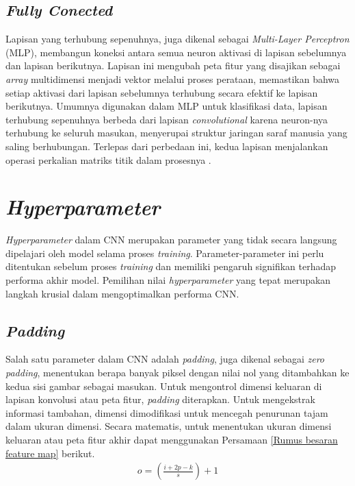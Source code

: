     
\subsection{\textit{Fully Conected}}

    Lapisan yang terhubung sepenuhnya, juga dikenal sebagai \textit{Multi-Layer Perceptron} (MLP), membangun koneksi antara semua neuron aktivasi di lapisan sebelumnya dan lapisan berikutnya. Lapisan ini mengubah peta fitur yang disajikan sebagai \textit{array} multidimensi menjadi vektor melalui proses perataan, memastikan bahwa setiap aktivasi dari lapisan sebelumnya terhubung secara efektif ke lapisan berikutnya. Umumnya digunakan dalam MLP untuk klasifikasi data, lapisan terhubung sepenuhnya berbeda dari lapisan \textit{convolutional} karena neuron-nya terhubung ke seluruh masukan, menyerupai struktur jaringan saraf manusia yang saling berhubungan. Terlepas dari perbedaan ini, kedua lapisan menjalankan operasi perkalian matriks titik dalam prosesnya \cite{Dewi2018}.

    





\section{\textit{Hyperparameter}}

    \textit{Hyperparameter} dalam CNN merupakan parameter yang tidak secara langsung dipelajari oleh model selama proses \textit{training}. Parameter-parameter ini perlu ditentukan sebelum proses \textit{training} dan memiliki pengaruh signifikan terhadap performa akhir model. Pemilihan nilai \textit{hyperparameter} yang tepat merupakan langkah krusial dalam mengoptimalkan performa CNN.

 \subsection{\textit{Padding}}


    Salah satu parameter dalam CNN adalah \textit{padding}, juga dikenal sebagai \textit{zero padding}, menentukan berapa banyak piksel dengan nilai nol yang ditambahkan ke kedua sisi gambar sebagai masukan. Untuk mengontrol dimensi keluaran di lapisan konvolusi atau peta fitur, \textit{padding} diterapkan. Untuk mengekstrak informasi tambahan, dimensi dimodifikasi untuk mencegah penurunan tajam dalam ukuran dimensi. Secara matematis, untuk menentukan ukuran dimensi keluaran atau peta fitur akhir dapat menggunakan Persamaan \ref{Rumus besaran feature map} \cite{hakim2018implementasi} berikut.
    \begin{equation}
        \begin{aligned}
          o = \left( \frac{i + 2p - k}{s} \right) + 1
      \end{aligned}\label{Rumus besaran feature map}
    \end{equation}



